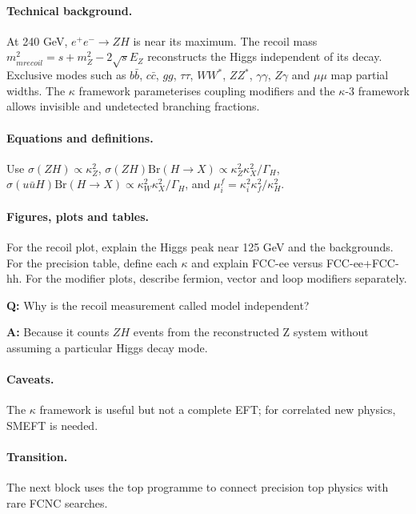 \documentclass[11pt,a4paper]{report}
\newcommand{\ee}{e^+e^-}
\newcommand{\br}{\mathrm{Br}}
\begin{document}
\paragraph{Technical background.}
At 240 GeV, $\ee\to ZH$ is near its maximum.  The recoil mass $m_{
m recoil}^2=s+m_Z^2-2\sqrt{s}E_Z$ reconstructs the Higgs independent of its decay.  Exclusive modes such as $b\bar b$, $c\bar c$, $gg$, $\tau\tau$, $WW^*$, $ZZ^*$, $\gamma\gamma$, $Z\gamma$ and $\mu\mu$ map partial widths.  The $\kappa$ framework parameterises coupling modifiers and the $\kappa$-3 framework allows invisible and undetected branching fractions.

\paragraph{Equations and definitions.}
Use $\sigma(ZH)\propto \kappa_Z^2$, $\sigma(ZH)\br(H\to X)\propto \kappa_Z^2\kappa_X^2/\Gamma_H$, $\sigma(
u\bar
u H)\br(H\to X)\propto \kappa_W^2\kappa_X^2/\Gamma_H$, and $\mu_i^f=\kappa_i^2\kappa_f^2/\kappa_H^2$.

\paragraph{Figures, plots and tables.}
For the recoil plot, explain the Higgs peak near 125 GeV and the backgrounds.  For the precision table, define each $\kappa$ and explain FCC-ee versus FCC-ee+FCC-hh.  For the modifier plots, describe fermion, vector and loop modifiers separately.

\begin{questionbox}
\textbf{Q:} Why is the recoil measurement called model independent?\par
\textbf{A:} Because it counts $ZH$ events from the reconstructed Z system without assuming a particular Higgs decay mode.
\end{questionbox}

\paragraph{Caveats.}
The $\kappa$ framework is useful but not a complete EFT; for correlated new physics, SMEFT is needed.

\paragraph{Transition.}
The next block uses the top programme to connect precision top physics with rare FCNC searches.
\end{document}
